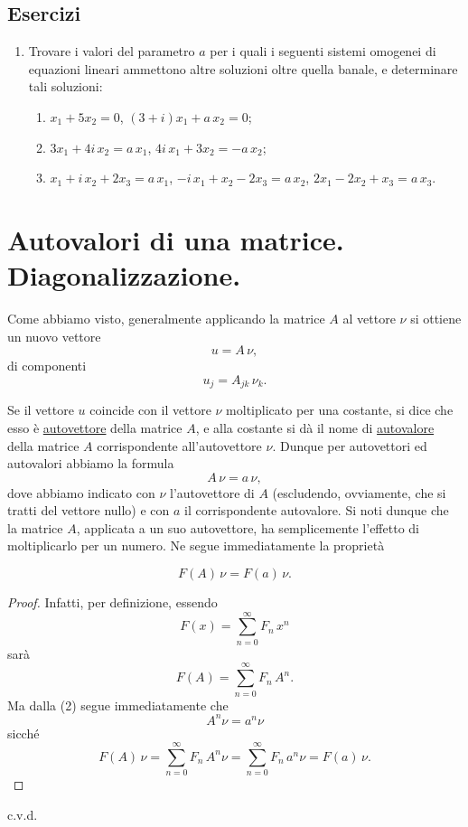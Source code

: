 \documentclass[11pt, a4paper]{book}
\numberwithin{equation}{section}
\newenvironment{esercizi}{\subsection*{Esercizi}\begin{enumerate}}{\end{enumerate}}
\begin{document}
\begin{esercizi}
\item Trovare i valori del parametro $a$ per i quali i seguenti sistemi
omogenei di equazioni lineari ammettono altre soluzioni oltre quella
banale, e determinare tali soluzioni:
\begin{enumerate}
  \item $x_1 + 5x_2 = 0$, \quad $(3+i)x_1 + a\,x_2 = 0$;
  \item $3x_1 + 4i\,x_2 = a\,x_1$, \quad $4i\,x_1 + 3x_2 = -a\,x_2$;
  \item $x_1 + i\,x_2 + 2x_3 = a\,x_1$, \quad
        $-i\,x_1 + x_2 - 2x_3 = a\,x_2$, \quad
        $2x_1 - 2x_2 + x_3 = a\,x_3$.
\end{enumerate}

\end{esercizi}

\section{Autovalori di una matrice. Diagonalizzazione.}

Come abbiamo visto, generalmente applicando la matrice $A$ al vettore $\nu$
si ottiene un nuovo vettore
\begin{equation}
u = A\,\nu,
\end{equation}
di componenti
\begin{equation}
u_j = A_{jk}\,\nu_k.
\end{equation}

Se il vettore $u$ coincide con il vettore $\nu$ moltiplicato per una
costante, si dice che esso è \uline{autovettore} della matrice $A$, e
alla costante si dà il nome di \uline{autovalore} della matrice $A$
corrispondente all'autovettore $\nu$. Dunque per autovettori ed autovalori
abbiamo la formula
\begin{equation}
A\,\nu = a\,\nu,
\end{equation}
dove abbiamo indicato con $\nu$ l'autovettore di $A$ (escludendo,
ovviamente, che si tratti del vettore nullo) e con $a$ il corrispondente
autovalore. Si noti dunque che la matrice $A$, applicata a un suo
autovettore, ha semplicemente l'effetto di moltiplicarlo per un numero. Ne
segue immediatamente la proprietà


\begin{equation}
F(A)\,\nu = F(a)\,\nu.
\end{equation}

\begin{proof}
Infatti, per definizione, essendo
\[
F(x) = \sum_{n=0}^{\infty} F_n\, x^n
\]
sarà
\[
F(A) = \sum_{n=0}^{\infty} F_n\, A^n.
\]
Ma dalla (2) segue immediatamente che
\[
A^n \nu = a^n \nu
\]
sicché
\[
F(A)\,\nu = \sum_{n=0}^{\infty} F_n\, A^n \nu
           = \sum_{n=0}^{\infty} F_n\, a^n \nu
           = F(a)\,\nu.
\]
\end{proof}
\noindent c.v.d.
\end{document}
